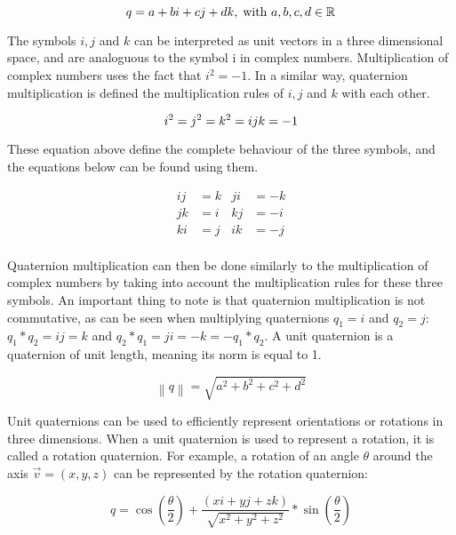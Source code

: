 		\begin{equation}
			q = a + bi + cj + dk, \; \text{with } a, b, c, d \in \mathbb{R} \\
		\end{equation}
		
		The symbols \( i, j \) and \( k \) can be interpreted as unit vectors in a three dimensional space, and are analoguous to the symbol i in complex numbers. Multiplication of complex numbers uses the fact that \( i^2 = -1 \). In a similar way, quaternion multiplication is defined the multiplication rules of \( i, j \) and \( k \) with each other.
		
		\begin{equation}
			i^2 = j^2 = k^2 = ijk = -1 \\
		\end{equation}
		
		These equation above define the complete behaviour of the three symbols, and the equations below can be found using them.
		
		\begin{align*}
			ij &= k & ji &= -k \\
			jk &= i & kj &= -i \\
			ki &= j & ik &= -j \\
		\end{align*}
		
		Quaternion multiplication can then be done similarly to the multiplication of complex numbers by taking into account the multiplication rules for these three symbols. An important thing to note is that quaternion multiplication is not commutative, as can be seen when multiplying quaternions \( q_1 = i \) and \( q_2 = j \): \( q_1*q_2 = ij = k \) and \( q_2*q_1 = ji = -k = -q_1*q_2 \). A unit quaternion is a quaternion of unit length, meaning its norm is equal to 1. 
		
		\begin{equation}
			\left \| q \right \| = \sqrt{a^2 + b^2 + c^2 + d^2}
		\end{equation}
		
		Unit quaternions can be used to efficiently represent orientations or rotations in three dimensions. When a unit quaternion is used to represent a rotation, it is called a rotation quaternion. For example, a rotation of an angle \( \theta \) around the axis \( \vec{v} = (x, y, z) \) can be represented by the rotation quaternion:
		
		\begin{equation}
			q = \cos(\frac{\theta}{2}) + \frac{(xi + yj + zk)}{\sqrt{x^2 + y^2 + z^2}}*\sin(\frac{\theta}{2})
		\end{equation}
		
